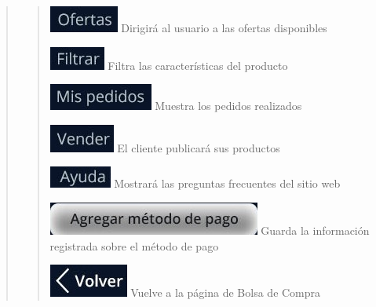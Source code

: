 \documentclass[14pt]{article}
\begin{document}
\begin{quote}
\begin{quote}
                            \includegraphics[height=0.02\textwidth]{BotonOfertas.jpg}
                            \label{P7:BotonOfertas} Dirigirá al usuario a las ofertas disponibles
                            
                            \includegraphics[height=0.02\textwidth]{BotonFiltrar.jpg}
                            \label{P7:BotonFiltrar} Filtra las características del producto
                            
                            \includegraphics[height=0.02\textwidth]{BotonMisPedidos.jpg}
                            \label{P7:BotonMisPedidos} Muestra los pedidos realizados
                           
                            \includegraphics[height=0.02\textwidth]{BotonVender.jpg}
                            \label{P7:BotonVender} El cliente publicará sus productos
                            
                            \includegraphics[height=0.02\textwidth]{BotonAyuda.jpg}
                            \label{P7:BotonAyuda} Mostrará las preguntas frecuentes del sitio web
                            
                            \includegraphics[height=0.02\textwidth]{BotonAgregarMetodoDePago.jpg}
                            \label{P7:BotonAgregarMetodoDePago} Guarda la información registrada sobre el método de pago
                            
                            \includegraphics[height=0.02\textwidth]{BotonVolver.jpg}
                            \label{P7:BotonVolver} Vuelve a la página de Bolsa de Compra
                    \end{quote}
                \end{quote}
            
\end{document}
